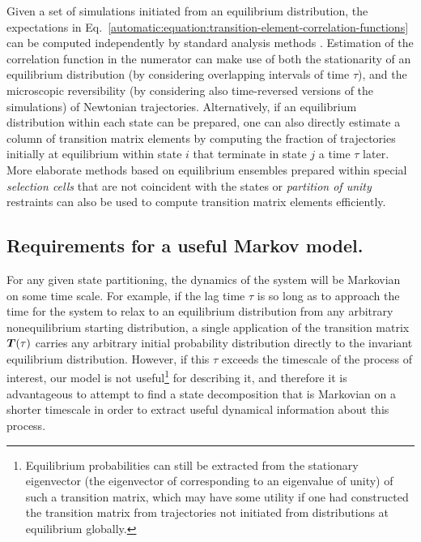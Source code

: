 Given a set of simulations initiated from an equilibrium distribution, the expectations in Eq.\ \ref{automatic:equation:transition-element-correlation-functions} can be computed independently by standard analysis methods \cite{allen:1991a}.
Estimation of the correlation function in the numerator can make use of both the stationarity of an equilibrium distribution (by considering overlapping intervals of time $\tau$), and the microscopic reversibility (by considering also time-reversed versions of the simulations) 
of Newtonian trajectories.
Alternatively, if an equilibrium distribution within each state can be prepared, one can also directly estimate a column of transition matrix elements by computing the fraction of trajectories initially at equilibrium within state $i$ that terminate in state $j$ a time $\tau$ later.
More elaborate methods based on equilibrium ensembles prepared within special \emph{selection cells} that are not coincident with the states \cite{swope:2004a,swope:2004b} or \emph{partition of unity} restraints \cite{weber-thesis:2006a} can also be used to compute transition matrix elements efficiently.

\subsection{Requirements for a useful Markov model.}
\label{automatic:section:theory:requirements-for-markovian-behavior}

For any given state partitioning, the dynamics of the system will be Markovian on some time scale.
For example, if the lag time $\tau$ is so long as to approach the time for the system to relax to an equilibrium distribution from any arbitrary nonequilibrium starting distribution, a single application of the transition matrix ${\mbox{\boldmath{$T$}}}(\tau)$ carries any arbitrary initial probability distribution directly to the invariant equilibrium distribution.
However, if this $\tau$ exceeds the timescale of the process of interest, our model is not useful\footnote{Equilibrium probabilities can still be extracted from the stationary eigenvector (the eigenvector of corresponding to an eigenvalue of unity) of such a transition matrix, which may have some utility if one had constructed the transition matrix from trajectories not initiated from distributions at equilibrium globally.} for describing it, and therefore it is advantageous to attempt to find a state decomposition that is Markovian on a shorter timescale in order to extract useful dynamical information about this process. 

